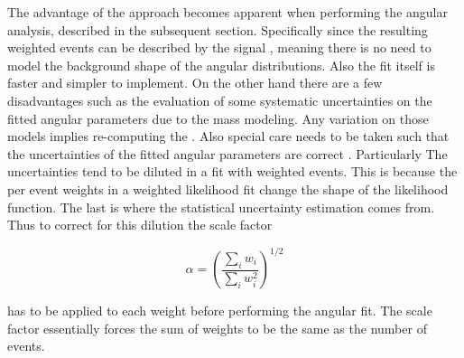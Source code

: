 The advantage of the \sWeights approach becomes apparent when performing the angular analysis, described in the subsequent section. Specifically since the resulting
\BsJpsiKst weighted events can be described by the signal \pdf, meaning there is no need to model the background shape of the angular distributions.
Also the fit itself is faster and simpler to implement. On the other hand there are a few
disadvantages such as the evaluation of some systematic uncertainties on the fitted angular parameters due to the mass \pdf modeling.
Any variation on those models implies re-computing the \sWeights. Also special care needs to be taken such that the uncertainties
of the fitted angular parameters are correct \cite{splot}. Particularly The uncertainties tend to be diluted in a fit with weighted
events. This is because the per event weights in a weighted likelihood fit change the shape of the likelihood function. The last is
where the statistical uncertainty estimation comes from. Thus to correct for this dilution the scale factor

\begin{equation}
\alpha = \left(\frac{\sum_{i} w_i}{\sum_{i} w_i^2}\right)^{1/2}
\label{sWeights_scale_factor}
\end{equation}

\noindent has to be applied to each weight before performing the angular fit. The scale factor essentially forces the sum of weights
to be the same as the number of events.
